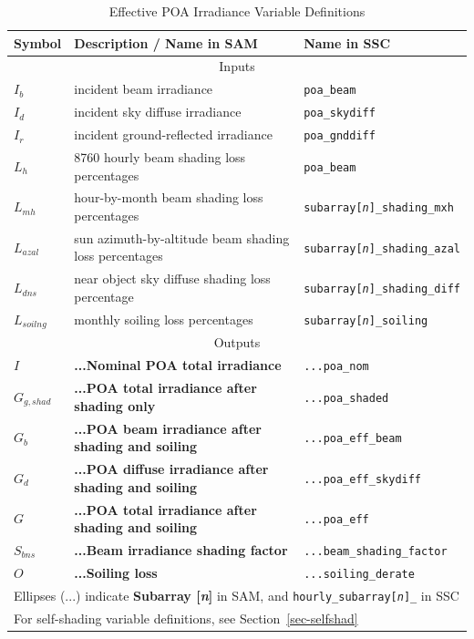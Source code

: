 \documentclass[12pt,letterpaper]{article}
\begin{document}
\begin{table}
\begin{center}
\caption{Effective POA Irradiance Variable Definitions}
\begin{tabular}{lll}
\midrule
Symbol & Description / \textbf{Name in SAM} & Name in SSC\\
\midrule
\multicolumn{3}{c}{Inputs}\\
$I_b$ & incident beam irradiance  & \texttt{poa\_beam}\\
$I_d$ & incident sky diffuse irradiance & \texttt{poa\_skydiff}\\
$I_r$ & incident ground-reflected irradiance & \texttt{poa\_gnddiff}\\
$L_h$ & 8760 hourly beam shading loss percentages  & \texttt{poa\_beam}\\
$L_{mh}$ & hour-by-month beam shading loss percentages & \texttt{subarray[\textit{n}]\_shading\_mxh}\\
$L_{azal}$ & sun azimuth-by-altitude beam shading loss percentages & \texttt{subarray[\textit{n}]\_shading\_azal}\\
$L_{dns}$ & near object sky diffuse shading loss percentage  & \texttt{subarray[\textit{n}]\_shading\_diff}\\
$L_{soilng}$ & monthly soiling loss percentages  & \texttt{subarray[\textit{n}]\_soiling}\\
\midrule
\multicolumn{3}{c}{Outputs}\\
$I$ & \textbf{...Nominal POA total irradiance} & \texttt{...poa\_nom}\\
$G_{g,shad}$ & \textbf{...POA total irradiance after shading only} & \texttt{...poa\_shaded}\\
$G_b$ & \textbf{...POA beam irradiance after shading and soiling} & \texttt{...poa\_eff\_beam}\\
$G_d$ & \textbf{...POA diffuse irradiance after shading and soiling} & \texttt{...poa\_eff\_skydiff}\\
$G$ & \textbf{...POA total irradiance after shading and soiling} & \texttt{...poa\_eff}\\
$S_{bns}$ & \textbf{...Beam irradiance shading factor} & \texttt{...beam\_shading\_factor}\\
$O$ & \textbf{...Soiling loss} & \texttt{...soiling\_derate}\\
\midrule
\multicolumn{3}{l}{Ellipses (...) indicate \textbf{Subarray [\textit{n}]} in SAM, and \texttt{hourly\_subarray[\textit{n}]\_} in SSC}\\
\multicolumn{3}{l}{For self-shading variable definitions, see Section~\ref{sec-selfshad}}\\
\end{tabular}
\label{tab-effectiveirradiancevars}
\end{center}
\end{table}
\end{document}

